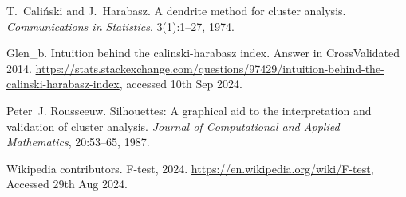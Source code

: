\documentclass[a4paper,12pt]{article}
\begin{document}
\begin{thebibliography}{1}

  T.~Caliński and J.~Harabasz. A dendrite method for cluster analysis.
    {\em Communications in Statistics}, 3(1):1--27, 1974.


  Glen\_b. Intuition behind the calinski-harabasz index. Answer in CrossValidated 2014.
  \url{https://stats.stackexchange.com/questions/97429/intuition-behind-the-calinski-harabasz-index}, accessed 10th Sep 2024.

  Peter~J. Rousseeuw. Silhouettes: A graphical aid to the interpretation and validation of cluster analysis. {\em Journal of Computational and Applied Mathematics}, 20:53--65, 1987.

  Wikipedia contributors. F-test, 2024.
  \url{https://en.wikipedia.org/wiki/F-test}, Accessed 29th Aug 2024.

\end{thebibliography}
\end{document}
